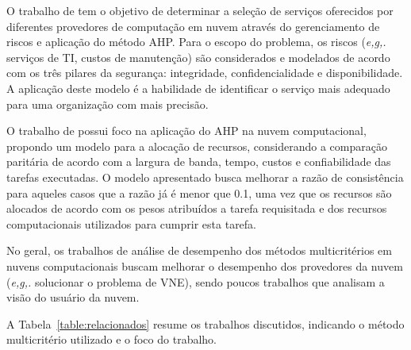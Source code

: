 O trabalho de  tem o objetivo de determinar a seleção de serviços oferecidos por diferentes provedores de computação em nuvem através do gerenciamento de riscos e aplicação do método AHP. Para o escopo do problema, os riscos (\textit{e,g,.} serviços de TI, custos de manutenção) são considerados e modelados de acordo com os três pilares da segurança: integridade, confidencialidade e disponibilidade. A aplicação deste modelo é a habilidade de identificar o serviço mais adequado para uma organização com mais precisão.

O trabalho de  possui foco na aplicação do AHP na nuvem computacional, propondo um modelo para a alocação de recursos,  considerando a comparação paritária de acordo com a largura de banda, tempo, custos e confiabilidade das tarefas executadas. O modelo apresentado busca melhorar a razão de consistência  para aqueles casos que a razão já é menor que 0.1, uma vez que os recursos são alocados de acordo com os pesos atribuídos a tarefa requisitada e dos recursos computacionais utilizados para cumprir esta tarefa.

No geral, os trabalhos de análise de desempenho dos métodos multicritérios em nuvens computacionais buscam melhorar o desempenho dos provedores da nuvem (\textit{e,g,.} solucionar o problema de VNE), sendo poucos trabalhos que analisam a visão do usuário da nuvem.

A Tabela~\ref{table:relacionados} resume os trabalhos discutidos, indicando o método multicritério utilizado e o foco do trabalho.

